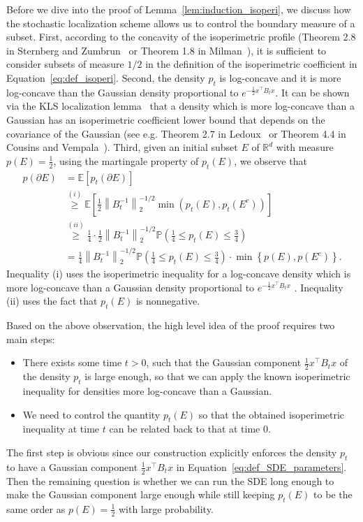 \documentclass[11pt,twoside]{article}
\theoremstyle{named}
\theoremstyle{plain}
\newcommand{\vecnorm}[2]{\left\| #1\right\|_{#2}}
\newcommand{\Exs}{\ensuremath{{\mathbb{E}}}}
\newcommand{\Prob}{\ensuremath{{\mathbb{P}}}}
\newcommand{\usedim}{\ensuremath{d}}
\newcommand{\dims}{\usedim}
\newcommand{\real}{\ensuremath{\mathbb{R}}}
\newcommand{\brackets}[1]{\left[ #1 \right]}
\newcommand{\parenth}[1]{\left( #1 \right)}
\newcommand{\braces}[1]{\left\{ #1 \right \}}
\newcommand{\tp}{^\top}
\begin{document}
Before we dive into the proof of Lemma~\ref{lem:induction_isoperi}, we discuss how the stochastic localization scheme allows us to control the boundary measure of a subset. First, according to the concavity of the isoperimetric profile (Theorem 2.8 in Sternberg and Zumbrun~\cite{sternberg1999connectivity} or Theorem 1.8 in Milman~\cite{milman2009role}), it is sufficient to consider subsets of measure $1/2$ in the definition of the isoperimetric coefficient in Equation~\eqref{eq:def_isoperi}. Second, the density $p_t$ is log-concave and it is more log-concave than the Gaussian density proportional to $e^{-\frac{1}{2}x\tp B_t x}$. It can be shown via the KLS localization lemma~\cite{kannan1995isoperimetric} that a density which is more log-concave than a Gaussian has an isoperimetric coefficient lower bound that depends on the covariance of the Gaussian (see e.g. Theorem 2.7 in Ledoux~\cite{ledoux2001concentration} or Theorem 4.4 in Cousins and Vempala~\cite{cousins2014cubic}).  Third, given an initial subset $E$ of $\real^\dims$ with measure $p(E) = \frac{1}{2}$, using the martingale property of $p_t(E)$, we observe that
\begin{align*}
  p(\partial E) &= \Exs \brackets{p_t(\partial E)} \\
  & \stackrel{(i)}{\geq} \Exs\brackets{\frac{1}{2}\vecnorm{B_t^{-1}}{2}^{-1/2} \min \parenth{p_t(E), p_t(E^c)}} \\
  & \stackrel{(ii)}{\geq} \frac{1}{4}\cdot \frac{1}{2}\vecnorm{B_t^{-1}}{2}^{-1/2} \Prob( \frac{1}{4}\leq p_t(E) \leq \frac{3}{4})\\
  & = \frac{1}{4}\vecnorm{B_t^{-1}}{2}^{-1/2} \Prob( \frac{1}{4}\leq p_t(E) \leq \frac{3}{4}) \cdot \min\braces{p(E), p(E^c)}.
\end{align*}
Inequality (i) uses the isoperimetric inequality for a log-concave density which is more log-concave than a Gaussian density proportional to $e^{-\frac{1}{2}x\tp B_t x}$ \cite{ledoux2001concentration,cousins2014cubic}. Inequality (ii) uses the fact that $p_t(E)$ is nonnegative.

Based on the above observation, the high level idea of the proof requires two main steps:
\begin{itemize}
  \item There exists some time $t > 0$, such that the Gaussian component $\frac{1}{2}x\tp B_t x$ of the density $p_t$ is large enough, so that we can apply the known isoperimetric inequality for densities more log-concave than a Gaussian.
  \item We need to control the quantity $p_t(E)$ so that the obtained isoperimetric inequality at time $t$ can be related back to that at time 0.
\end{itemize}
The first step is obvious since our construction explicitly enforces the density $p_t$ to have a Gaussian component $\frac{1}{2}x\tp B_t x$ in Equation~\eqref{eq:def_SDE_parameters}. Then the remaining question is whether we can run the SDE long enough to make the Gaussian component large enough while still keeping $p_t(E)$ to be the same order as $p(E) = \frac{1}{2}$ with large probability.
\end{document}
